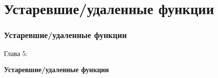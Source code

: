 %

\section{Устаревшие/удаленные функции}
\begin{frame}[fragile]
	\frametitle{Устаревшие/удаленные функции}

	\begin{center}\huge{Глава 5:}\end{center}
	\begin{center}\huge{\color{typo3darkgrey}\textbf{Устаревшие/удаленные функции}}\end{center}

\end{frame}


